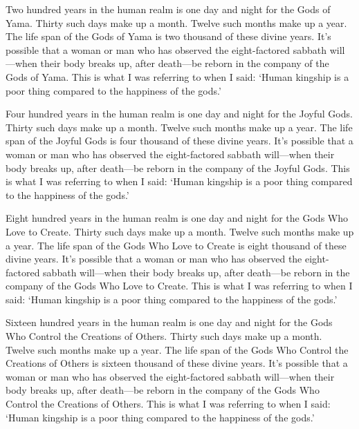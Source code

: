 \documentclass[12pt,openany]{book}%
\begin{document}
Two hundred years in the human realm is one day and night for the Gods of Yama. Thirty such days make up a month. Twelve such months make up a year. The life span of the Gods of Yama is two thousand of these divine years. It’s possible that a woman or man who has observed the eight-factored sabbath will—when their body breaks up, after death—be reborn in the company of the Gods of Yama. This is what I was referring to when I said: ‘Human kingship is a poor thing compared to the happiness of the gods.’ 

Four hundred years in the human realm is one day and night for the Joyful Gods. Thirty such days make up a month. Twelve such months make up a year. The life span of the Joyful Gods is four thousand of these divine years. It’s possible that a woman or man who has observed the eight-factored sabbath will—when their body breaks up, after death—be reborn in the company of the Joyful Gods. This is what I was referring to when I said: ‘Human kingship is a poor thing compared to the happiness of the gods.’ 

Eight hundred years in the human realm is one day and night for the Gods Who Love to Create. Thirty such days make up a month. Twelve such months make up a year. The life span of the Gods Who Love to Create is eight thousand of these divine years. It’s possible that a woman or man who has observed the eight-factored sabbath will—when their body breaks up, after death—be reborn in the company of the Gods Who Love to Create. This is what I was referring to when I said: ‘Human kingship is a poor thing compared to the happiness of the gods.’ 

Sixteen hundred years in the human realm is one day and night for the Gods Who Control the Creations of Others. Thirty such days make up a month. Twelve such months make up a year. The life span of the Gods Who Control the Creations of Others is sixteen thousand of these divine years. It’s possible that a woman or man who has observed the eight-factored sabbath will—when their body breaks up, after death—be reborn in the company of the Gods Who Control the Creations of Others. This is what I was referring to when I said: ‘Human kingship is a poor thing compared to the happiness of the gods.’ 
\end{document}
